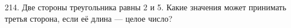 214. Две стороны треугольника равны 2 и 5. Какие значения может принимать третья сторона, если её длина --- целое число?\\
